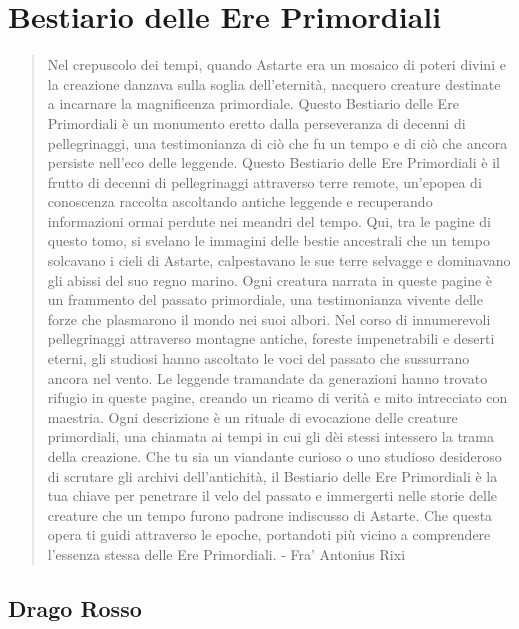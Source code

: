 \section{Bestiario delle Ere
Primordiali}\label{bestiario-delle-ere-primordiali}

\begin{quote}
Nel crepuscolo dei tempi, quando Astarte era un mosaico di poteri divini
e la creazione danzava sulla soglia dell'eternità, nacquero creature
destinate a incarnare la magnificenza primordiale. Questo Bestiario
delle Ere Primordiali è un monumento eretto dalla perseveranza di
decenni di pellegrinaggi, una testimonianza di ciò che fu un tempo e di
ciò che ancora persiste nell'eco delle leggende. Questo Bestiario delle
Ere Primordiali è il frutto di decenni di pellegrinaggi attraverso terre
remote, un'epopea di conoscenza raccolta ascoltando antiche leggende e
recuperando informazioni ormai perdute nei meandri del tempo. Qui, tra
le pagine di questo tomo, si svelano le immagini delle bestie ancestrali
che un tempo solcavano i cieli di Astarte, calpestavano le sue terre
selvagge e dominavano gli abissi del suo regno marino. Ogni creatura
narrata in queste pagine è un frammento del passato primordiale, una
testimonianza vivente delle forze che plasmarono il mondo nei suoi
albori. Nel corso di innumerevoli pellegrinaggi attraverso montagne
antiche, foreste impenetrabili e deserti eterni, gli studiosi hanno
ascoltato le voci del passato che sussurrano ancora nel vento. Le
leggende tramandate da generazioni hanno trovato rifugio in queste
pagine, creando un ricamo di verità e mito intrecciato con maestria.
Ogni descrizione è un rituale di evocazione delle creature primordiali,
una chiamata ai tempi in cui gli dèi stessi intessero la trama della
creazione. Che tu sia un viandante curioso o uno studioso desideroso di
scrutare gli archivi dell'antichità, il Bestiario delle Ere Primordiali
è la tua chiave per penetrare il velo del passato e immergerti nelle
storie delle creature che un tempo furono padrone indiscusso di Astarte.
Che questa opera ti guidi attraverso le epoche, portandoti più vicino a
comprendere l'essenza stessa delle Ere Primordiali. - Fra' Antonius Rixi
\end{quote}

\subsection{Drago Rosso}\label{drago-rosso}

